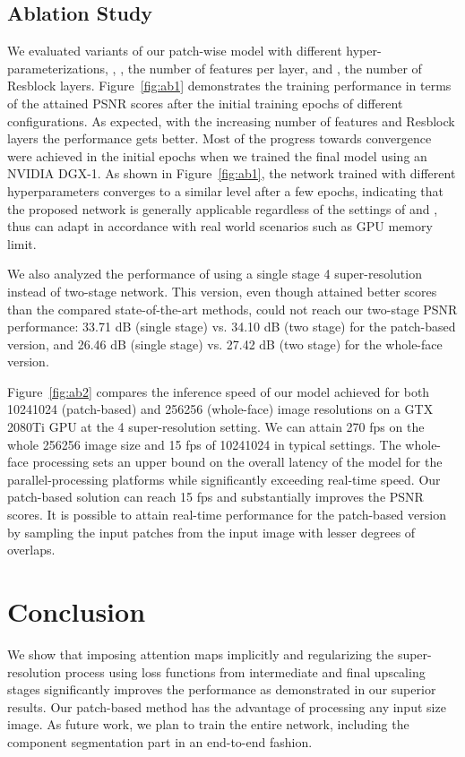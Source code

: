 \documentclass[10pt,twocolumn,letterpaper]{article}
\begin{document}
\subsection{Ablation Study}

We evaluated variants of our patch-wise model with different hyper-parameterizations, \ie, , the number of features per layer, and , the number of Resblock layers. Figure~\ref{fig:ab1} demonstrates the training performance in terms of the attained PSNR scores after the initial training epochs of different configurations. As expected, with the increasing number of features and Resblock layers the performance gets better. 
Most of the progress towards convergence were achieved in the initial epochs when we trained the final model using an NVIDIA DGX-1.
As shown in Figure~\ref{fig:ab1}, the network trained with different hyperparameters converges to a similar level after a few epochs, indicating that the proposed network is generally applicable regardless of the settings of  and , thus can adapt in accordance with real world scenarios such as GPU memory limit.

We also analyzed the performance of using a single stage 4 super-resolution instead of two-stage network. This version, even though attained better scores than the compared state-of-the-art methods, could not reach our two-stage PSNR performance: 33.71 dB (single stage) vs. 34.10 dB (two stage) for the patch-based version, and 26.46 dB (single stage) vs. 27.42 dB (two stage) for the whole-face version. 

Figure~\ref{fig:ab2} compares the inference speed of our model achieved for both 10241024 (patch-based) and 256256 (whole-face) image resolutions on a GTX 2080Ti GPU at the 4 super-resolution setting. We can attain 270 fps on the whole 256256 image size and 15 fps of 10241024 in typical settings. The whole-face processing sets an upper bound on the overall latency of the model for the parallel-processing platforms while significantly exceeding real-time speed. Our patch-based solution can reach 15 fps and substantially improves the PSNR scores. It is possible to attain real-time performance for the patch-based version by sampling the input patches from the input image with lesser degrees of overlaps.

 
\section{Conclusion}\label{sec:conclusion}
We show that imposing attention maps implicitly and regularizing the super-resolution process using loss functions from intermediate and final upscaling stages significantly improves the performance as demonstrated in our superior results. Our patch-based method has the advantage of processing any input size image. As future work, we plan to train the entire network, including the component segmentation part in an end-to-end fashion.  
{\small


}
\end{document}
